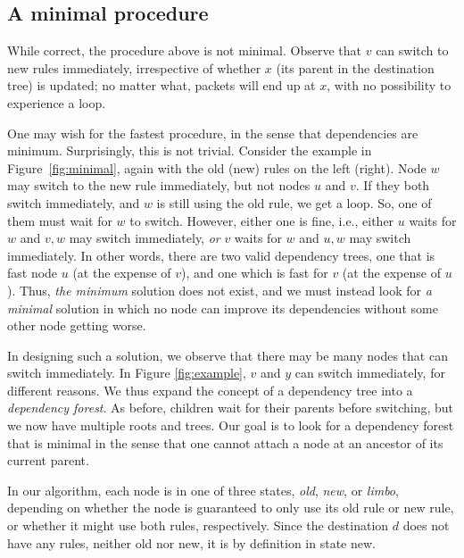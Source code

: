 \subsection{A minimal procedure}
\label{sec:minimal}


While correct, the procedure above is not minimal. Observe that $v$ can switch to new rules immediately, irrespective of whether $x$ (its parent in the destination tree) is updated; no matter what, packets will end up at $x$, with no possibility to experience a loop.

One may wish for the fastest procedure, in the sense that dependencies are minimum. Surprisingly, this is not trivial. Consider the example in Figure~\ref{fig:minimal}, again with the old (new) rules on the left (right). Node $w$ may switch to the new rule immediately, but not nodes $u$ and $v$. If they both switch immediately, and $w$ is still using the old rule, we get a loop. So, one of them must wait for $w$ to switch. However, either one is fine, i.e., either $u$ waits for $w$ and $v,w$ may switch immediately, \emph{or} $v$ waits for $w$ and $u,w$ may switch immediately. In other words, there are two valid dependency trees, one that is fast node $u$ (at the expense of $v$), and one which is fast for $v$ (at the expense of $u$).
Thus, \emph{the minimum} solution does not exist, and we must instead look for \emph{a minimal} solution in which no node can improve its dependencies without some other node getting worse.

In designing such a solution, we observe that there may be many nodes that can switch immediately. In Figure \ref{fig:example}, $v$ and $y$ can switch immediately, for different reasons. We thus expand the concept of a dependency tree into a \emph{dependency forest}. As before, children wait for their parents before switching, but we now have multiple roots and trees. Our goal is to look for a dependency forest that is minimal in the sense that one cannot attach a node at an ancestor of its current parent.

In our algorithm, each node is in one of three states, \emph{old}, \emph{new}, or \emph{limbo}, depending on whether the node is guaranteed to only use its old rule or new rule, or whether it might use both rules, respectively. Since the destination $d$ does not have any rules, neither old nor new, it is by definition in state new.



